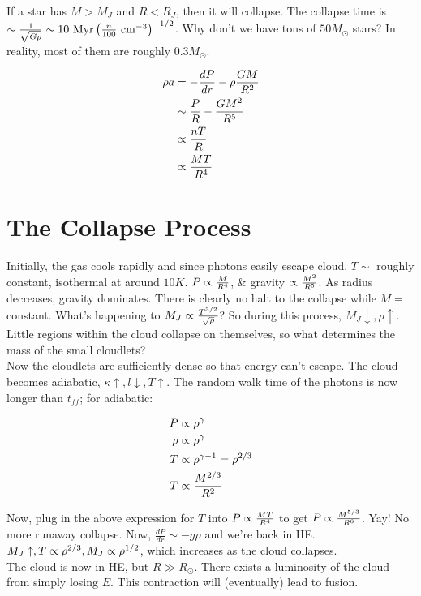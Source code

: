 If a star has $M>M_J$ and $R<R_J$, then it will collapse. The collapse time is $\sim \frac{1}{\sqrt{G\rho}} \sim 10\text{ Myr} \left( \frac{n}{100}\text{ cm}^{-3} \right)^{-1/2}$. Why don't we have tons of $50M_\odot$ stars? In reality, most of them are roughly $0.3M_\odot$. 

\begin{align}
\rho a &= -\frac{dP}{dr}- \rho \frac{GM}{R^2}\\
&\sim \frac{P}{R} - \frac{GM^2}{R^5}\\
&\propto \frac{nT}{R}\\
&\propto \frac{MT}{R^4}
\end{align}

\section{The Collapse Process}

Initially, the gas cools rapidly and since photons easily escape cloud, $T \sim$ roughly constant, isothermal at around $10K$. $P \propto \frac{M}{R^4}$, \& gravity $\propto \frac{M^2}{R^5}$. As radius decreases, gravity dominates. There is clearly no halt to the collapse while $M=$ constant. What's happening to $M_J \propto \frac{T^{3/2}}{\sqrt{\rho}}$? So during this process, $M_J \downarrow, \rho \uparrow$. Little regions within the cloud collapse on themselves, so what determines the mass of the small cloudlets? \\

\noindent Now the cloudlets are sufficiently dense so that energy can't escape. The cloud becomes adiabatic, $\kappa \uparrow, l \downarrow, T \uparrow$. The random walk time of the photons is now longer than $t_{ff}$; for adiabatic:

\begin{align}
P &\propto \rho^\gamma\\
\rho &\propto \rho^\gamma\\
T &\propto \rho^{\gamma-1} = \rho^{2/3}\\
T &\propto \frac{M^{2/3}}{R^2}
\end{align}

Now, plug in the above expression for $T$ into $P \propto \frac{MT}{R^4}$ to get $P \propto \frac{M^{5/3}}{R^6}$. Yay! No more runaway collapse. Now, $\frac{dP}{dr} \sim -g\rho$ and we're back in HE. $M_J \uparrow, T\propto \rho^{2/3}, M_J \propto \rho^{1/2}$, which increases as the cloud collapses.\\

The cloud is now in HE, but $R \gg R_\odot$. There exists a luminosity of the cloud from simply losing $E$. This contraction will (eventually) lead to fusion.

